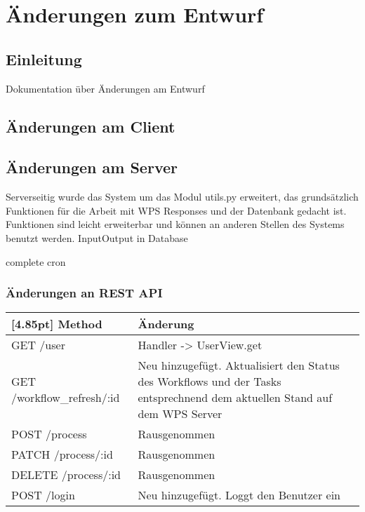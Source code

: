 \chapter{Änderungen zum Entwurf}
    
    \section{Einleitung}
        Dokumentation über Änderungen am Entwurf
    
    \section{Änderungen am Client}
    
    \section{Änderungen am Server}
        Serverseitig wurde das System um das Modul utils.py erweitert, das grundsätzlich Funktionen für die Arbeit mit WPS Responses und der Datenbank gedacht ist. Funktionen sind leicht erweiterbar und können an anderen Stellen des Systems benutzt werden. \newline
        InputOutput in Database
        
        complete cron
        
        
        
        \subsection{Änderungen an REST API}
        
		\begin{center}
            \begin{tabularx}{\textwidth}{|l|X|}
    			\hline
    			\rowcolor[gray]{0.90}[4.85pt]
    			Method & Änderung \\ \hline
    			GET /user & Handler -> UserView.get \\ \hline
    			GET /workflow\_refresh/:id & Neu hinzugefügt. Aktualisiert den Status des Workflows und der Tasks entsprechnend dem aktuellen Stand auf dem WPS Server \\ \hline
    			POST /process & Rausgenommen \\ \hline
    			PATCH /process/:id & Rausgenommen \\ \hline
    			DELETE /process/:id & Rausgenommen \\ \hline
    			POST /login & Neu hinzugefügt. Loggt den Benutzer ein  \\ \hline
    		\end{tabularx}
		\end{center}
	
